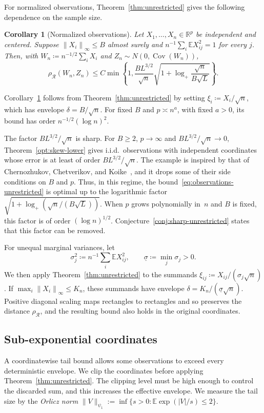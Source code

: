 \documentclass[11pt,letterpaper]{article}
\newtheorem{corollary}{Corollary}
\theoremstyle{remark}
\newcommand{\E}{\mathbb E}
\newcommand{\R}{\mathbb R}
\newcommand{\Cov}{\operatorname{Cov}}
\newcommand{\norm}[1]{\left\lVert#1\right\rVert}
\newcommand{\rh}{\rho_{\mathcal R}}
\begin{document}
For normalized observations, Theorem~\ref{thm:unrestricted} gives
the following dependence on the sample size.

\begin{corollary}[Normalized observations]\label{cor:observations}
Let \(X_1,\ldots,X_n\in\R^p\) be independent and centered. Suppose
\(\norm{X_i}_\infty\le B\) almost surely and
\(n^{-1}\sum_i\E X_{ij}^2=1\) for every \(j\). Then, with
\(W_n\coloneqq n^{-1/2}\sum_iX_i\) and \(Z_n\sim N(0,\Cov(W_n))\),
\begin{equation}
 \rh(W_n,Z_n)\le C\min\!\left\{1,
 \frac{B L^{3/2}}{\sqrt n}
 \sqrt{1+\log_+\frac{\sqrt n}{B\sqrt L}}\right\}.
 \label{eq:observations-unrestricted}
\end{equation}
\end{corollary}

Corollary~\ref{cor:observations} follows from Theorem~\ref{thm:unrestricted}
by setting \(\xi_i\coloneqq X_i/\sqrt n\), which has envelope \(\delta=B/\sqrt n\). For
fixed \(B\) and \(p\asymp n^a\), with fixed \(a>0\), its bound has
order \(n^{-1/2}(\log n)^2\).

The factor \(BL^{3/2}/\sqrt n\) is sharp. For \(B\ge2\), \(p\to\infty\) and
\(BL^{3/2}/\sqrt n\to0\), Theorem~\ref{opt:skew-lower} gives i.i.d.\ observations
with independent coordinates whose error is at least of order
\(BL^{3/2}/\sqrt n\). The example is inspired by that of Chernozhukov,
Chetverikov, and Koike~\cite[Proposition~2.1]{CCK}, and it drops some of their
side conditions on \(B\) and \(p\). Thus, in this regime, the
bound~\eqref{eq:observations-unrestricted} is optimal up to the logarithmic
factor \(\sqrt{1+\log_+(\sqrt n/(B\sqrt L))}\). When \(p\) grows polynomially
in~\(n\) and \(B\) is fixed, this factor is of order \((\log n)^{1/2}\).
Conjecture~\ref{conj:sharp-unrestricted} states that this factor can be removed.

For unequal marginal variances, let
\[
 \sigma_j^2\coloneqq n^{-1}\sum_i\E X_{ij}^2,
 \qquad
 \underline\sigma\coloneqq \min_j\sigma_j>0.
\]
We then apply Theorem~\ref{thm:unrestricted} to the summands
\(\xi_{ij}\coloneqq X_{ij}/(\sigma_j\sqrt n)\). If
\(\max_i\norm{X_i}_\infty\le K_n\), these summands have
envelope \(\delta=K_n/(\underline\sigma\sqrt n)\).
Positive diagonal scaling maps rectangles to rectangles and so preserves
the distance \(\rh\), and the resulting bound also holds in the
original coordinates.

\subsection{Sub-exponential coordinates}\label{sec:subexponential}
A coordinatewise tail bound allows some observations to exceed every
deterministic envelope. We clip the coordinates before applying
Theorem~\ref{thm:unrestricted}. The clipping level must be high enough
to control the discarded sum, and this increases the effective envelope.
We measure the tail size by the \emph{Orlicz norm}
\(\|V\|_{\psi_1}:=\inf\{s>0:\E\exp(|V|/s)\le2\}\).
\end{document}
